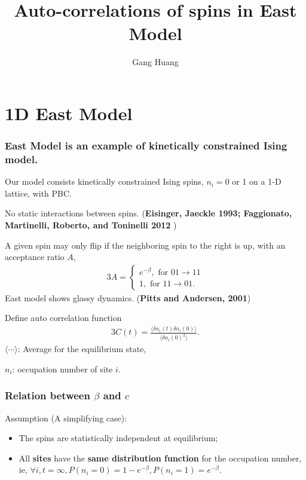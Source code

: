\documentclass[8pt]{beamer}
\title{Auto-correlations of spins in East Model}
\author{Gang Huang}
\begin{document}
\maketitle

\section{1D East Model}
\begin{frame}
	\frametitle{East Model is an example of kinetically constrained Ising model.} 
	Our model consists kinetically constrained Ising spins, $n_i =0$ or 1 on a 1-D lattice, with PBC. 
	
	No static interactions between spins. (\textbf{Eisinger, Jaeckle 1993; Faggionato, Martinelli, Roberto, and Toninelli 2012 })
	
	A given spin may only flip if the neighboring spin to the right is up, with an acceptance ratio $A$,
     \begin{alignat}{3}
       A = \left\{
       \begin{aligned}
	     e^{-\beta}, \text{ for } 01 \to 11 \\
         1, \text{ for } 11 \to 01.
       \end{aligned}
       \right
       .
     \end{alignat}
 East model shows glassy dynamics. (\textbf{Pitts and Andersen, 2001})
 
 Define auto correlation function
      \begin{alignat}{3}
      C(t) = \frac{\langle\delta n_i(t)\delta n_i (0)\rangle}{\langle \delta n_i(0)^2 \rangle}.
 \end{alignat}
$\langle \cdots \rangle$: Average for the equilibrium state,

$n_i$: occupation number of site $i$.
\end{frame}

\begin{frame}
	\frametitle{Relation between $\beta$ and $c$}
	Assumption (A simplifying case):
	\begin{itemize}
		\item The spins are statistically independent at equilibrium;
		\item  All \textbf{sites} have the \textbf{same distribution function} for the occupation number, ie, $\forall i,  t=\infty,  P(n_i=0)= 1-e^{-\beta}, P(n_i =1) = e^{-\beta}$. 
	\end{itemize}	
\end{frame}
\end{document}
